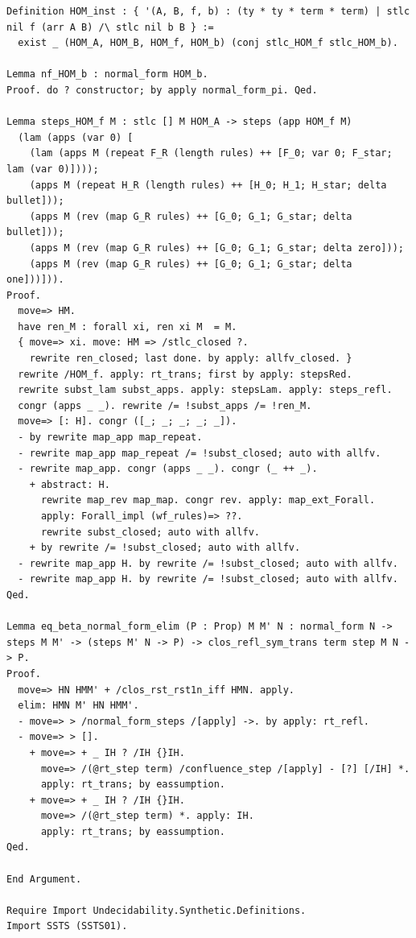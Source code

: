 \begin{lstlisting}
Definition HOM_inst : { '(A, B, f, b) : (ty * ty * term * term) | stlc nil f (arr A B) /\ stlc nil b B } :=
  exist _ (HOM_A, HOM_B, HOM_f, HOM_b) (conj stlc_HOM_f stlc_HOM_b).

Lemma nf_HOM_b : normal_form HOM_b.
Proof. do ? constructor; by apply normal_form_pi. Qed.

Lemma steps_HOM_f M : stlc [] M HOM_A -> steps (app HOM_f M) 
  (lam (apps (var 0) [
    (lam (apps M (repeat F_R (length rules) ++ [F_0; var 0; F_star; lam (var 0)])));
    (apps M (repeat H_R (length rules) ++ [H_0; H_1; H_star; delta bullet]));
    (apps M (rev (map G_R rules) ++ [G_0; G_1; G_star; delta bullet]));
    (apps M (rev (map G_R rules) ++ [G_0; G_1; G_star; delta zero]));
    (apps M (rev (map G_R rules) ++ [G_0; G_1; G_star; delta one]))])).
Proof.
  move=> HM.
  have ren_M : forall xi, ren xi M  = M.
  { move=> xi. move: HM => /stlc_closed ?.
    rewrite ren_closed; last done. by apply: allfv_closed. }
  rewrite /HOM_f. apply: rt_trans; first by apply: stepsRed.
  rewrite subst_lam subst_apps. apply: stepsLam. apply: steps_refl.
  congr (apps _ _). rewrite /= !subst_apps /= !ren_M.
  move=> [: H]. congr ([_; _; _; _; _]).
  - by rewrite map_app map_repeat.
  - rewrite map_app map_repeat /= !subst_closed; auto with allfv.
  - rewrite map_app. congr (apps _ _). congr (_ ++ _).
    + abstract: H.
      rewrite map_rev map_map. congr rev. apply: map_ext_Forall.
      apply: Forall_impl (wf_rules)=> ??.
      rewrite subst_closed; auto with allfv.
    + by rewrite /= !subst_closed; auto with allfv.
  - rewrite map_app H. by rewrite /= !subst_closed; auto with allfv.
  - rewrite map_app H. by rewrite /= !subst_closed; auto with allfv.
Qed.

Lemma eq_beta_normal_form_elim (P : Prop) M M' N : normal_form N -> steps M M' -> (steps M' N -> P) -> clos_refl_sym_trans term step M N -> P.
Proof.
  move=> HN HMM' + /clos_rst_rst1n_iff HMN. apply.
  elim: HMN M' HN HMM'.
  - move=> > /normal_form_steps /[apply] ->. by apply: rt_refl.
  - move=> > [].
    + move=> + _ IH ? /IH {}IH.
      move=> /(@rt_step term) /confluence_step /[apply] - [?] [/IH] *.
      apply: rt_trans; by eassumption.
    + move=> + _ IH ? /IH {}IH.
      move=> /(@rt_step term) *. apply: IH.
      apply: rt_trans; by eassumption.
Qed.

End Argument.

Require Import Undecidability.Synthetic.Definitions.
Import SSTS (SSTS01).


\end{lstlisting}
